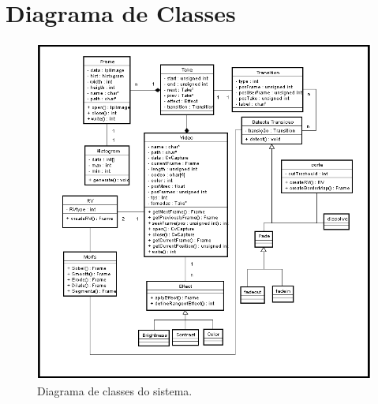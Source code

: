 \section{Diagrama de Classes \label{diagrama_classes}}

\begin{figure}[h|top]
 \centering
 \includegraphics[width=1.0\linewidth]{imagens/diagrama_de_classe.PNG}
 \caption{Diagrama de classes do sistema.}
 \label{img_diagrama_de_classes}
\end{figure}
